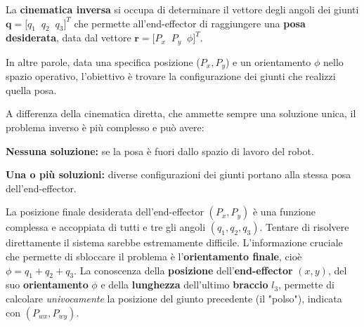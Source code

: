\documentclass[11pt, a4paper]{article}
\begin{document}

\begin{par}
\begin{flushleft}
La \textbf{cinematica inversa} si occupa di determinare il vettore degli angoli dei giunti $\mathbf{q}={\bigl\lbrack q_1 \;\;q_2 \;\;q_3 \bigr\rbrack }^T$ che permette all'end-effector di raggiungere una \textbf{posa desiderata}, data dal vettore $\mathbf{r}={\bigl\lbrack P_x \;\;P_y \;\;\phi \bigr\rbrack }^T$.
\end{flushleft}
\end{par}

\begin{par}
\begin{flushleft}
In altre parole, data una specifica posizione ($P_x ,P_y$) e un orientamento $\phi$ nello spazio operativo, l'obiettivo è trovare la configurazione dei giunti che realizzi quella posa.
\end{flushleft}
\end{par}

\begin{par}
\begin{flushleft}
A differenza della cinematica diretta, che ammette sempre una soluzione unica, il problema inverso è più complesso e può avere:
\end{flushleft}
\end{par}

\begin{par}
\begin{flushleft}
\textbf{Nessuna soluzione:} se la posa è fuori dallo spazio di lavoro del robot.
\end{flushleft}
\end{par}

\begin{par}
\begin{flushleft}
\textbf{Una o più soluzioni:} diverse configurazioni dei giunti portano alla stessa posa dell'end-effector.
\end{flushleft}
\end{par}

\begin{par}
\begin{flushleft}
La posizione finale desiderata dell'end-effector $(P_x ,P_y )$ è una funzione complessa e accoppiata di tutti e tre gli angoli $(q_1 ,q_2 ,q_3 )$. Tentare di risolvere direttamente il sistema sarebbe estremamente difficile. L'informazione cruciale che permette di sbloccare il problema è l'\textbf{orientamento finale}, cioè $\phi =q_1 +q_2 +q_3$. La conoscenza della \textbf{posizione} dell'\textbf{end-effector} $(x,y)$, del suo \textbf{orientamento} $\phi$ e della \textbf{lunghezza} dell'ultimo \textbf{braccio} $l_3$, permette di calcolare \textit{univocamente} la posizione del giunto precedente (il "polso"), indicata con $(P_{wx} ,P_{wy} )$.
\end{flushleft}
\end{par}
\end{document}
